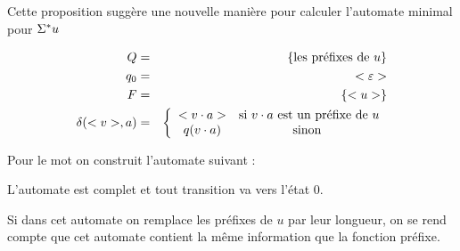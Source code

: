 Cette proposition suggère une nouvelle manière pour calculer l'automate minimal pour $\Sigma^{*} u$

\begin{eqnarray*}
	Q  &=& \left\{\text {les préfixes de } u\right\} \\
	q_0 &=& <\varepsilon> \\
	F &=& \left\{<u>\right\} \\
	\delta(<v>,a) &=&  \left\{ \begin{array}{cc}
		<v \cdot a>  & \text{si } v\cdot a \text{ est un préfixe de } u \\
		q(v \cdot a) & \text{sinon }
	\end{array}\right.
\end{eqnarray*}

\begin{exemple}
	Pour le mot  on construit l'automate suivant : \\
	\begin{automata}
	\end{automata}

	L'automate est complet et tout transition  va vers l'état 0.
\end{exemple}


\begin{remarque}
	Si dans cet automate on remplace les préfixes de $u$ par leur longueur, on se rend compte que cet automate
	contient la même information que la fonction préfixe.
\end{remarque}

